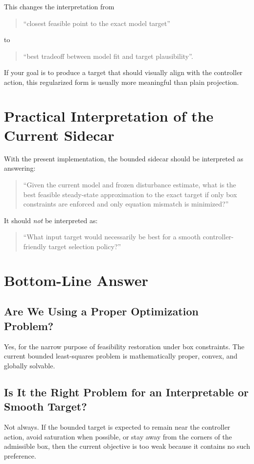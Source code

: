 \documentclass[11pt]{article}
\begin{document}
This changes the interpretation from
\begin{quote}
``closest feasible point to the exact model target''
\end{quote}
to
\begin{quote}
``best tradeoff between model fit and target plausibility''.
\end{quote}

If your goal is to produce a target that should visually align with the controller action, this regularized form is usually more meaningful than plain projection.

\section{Practical Interpretation of the Current Sidecar}

With the present implementation, the bounded sidecar should be interpreted as answering:
\begin{quote}
``Given the current model and frozen disturbance estimate, what is the best feasible steady-state approximation to the exact target if only box constraints are enforced and only equation mismatch is minimized?''
\end{quote}

It should \emph{not} be interpreted as:
\begin{quote}
``What input target would necessarily be best for a smooth controller-friendly target selection policy?''
\end{quote}

\section{Bottom-Line Answer}

\subsection{Are We Using a Proper Optimization Problem?}

Yes, for the narrow purpose of feasibility restoration under box constraints. The current bounded least-squares problem is mathematically proper, convex, and globally solvable.

\subsection{Is It the Right Problem for an Interpretable or Smooth Target?}

Not always. If the bounded target is expected to remain near the controller action, avoid saturation when possible, or stay away from the corners of the admissible box, then the current objective is too weak because it contains no such preference.
\end{document}
